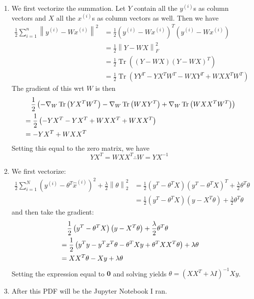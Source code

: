 \documentclass[12pt]{article}
\DeclareMathOperator{\Tr}{Tr}
\newcommand{\norm}[1]{\left\lVert#1\right\rVert}
\begin{document}
\begin{enumerate}
      \item We first vectorize the summation.
            Let $Y$ contain all the $y^{(i)}$s as column vectors
            and $X$ all the $x^{(i)}$s as column vectors as well.
            Then we have
            \begin{align*}
                  \frac{1}{2} \sum_{i=1}^{n} \norm{y^{(i)} - Wx^{(i)}}^2
                   & = \frac{1}{2} \left(y^{(i)} - Wx^{(i)}\right)^T\left(y^{(i)} - Wx^{(i)}\right) \\
                   & = \frac{1}{2} \norm{Y-WX}^2_F                                                  \\
                   & = \frac{1}{2} \Tr\left((Y-WX)(Y-WX)^T\right)                                   \\
                   & = \frac{1}{2} \Tr\left(YY^T-YX^TW^T-WXY^T+WXX^TW^T\right)
            \end{align*}
            The gradient of this wrt $W$ is then
            \begin{align*}
                   & \hphantom{={}} \frac{1}{2} \left(-\nabla_W \Tr\left(YX^TW^T\right)-\nabla_W \Tr\left(WXY^T\right)+\nabla_W \Tr\left(WXX^TW^T\right)\right) \\
                   & = \frac{1}{2} \left(-YX^T-YX^T+WXX^T+WXX^T\right)                                                                                          \\
                   & = -YX^T+WXX^T
            \end{align*}
            Setting this equal to the zero matrix, we have
            \[YX^T=WXX^T \therefore W=\boxed{YX^{-1}}\]

            \pagebreak

      \item We first vectorize:
            \begin{align*}
                  \frac{1}{2}\sum_{i=1}^{N} \left(y^{(i)}-\theta^T\hat{x}^{(i)}\right)^2+\frac{\lambda}{2}\norm{\theta}^2_2
                   & =\frac{1}{2}\left(y^T-\theta^TX\right)\left(y^T-\theta^TX\right)^T+\frac{\lambda}{2}\theta^T\theta \\
                   & =\frac{1}{2}\left(y^T-\theta^TX\right)\left(y-X^T\theta\right)+\frac{\lambda}{2}\theta^T\theta
            \end{align*}
            and then take the gradient:
            \begin{align*}
                   & \hphantom{={}}\frac{1}{2}\left(y^T-\theta^TX\right)\left(y-X^T\theta\right)+\frac{\lambda}{2}\theta^T\theta \\
                   & = \frac{1}{2}\left(y^Ty-y^Tx^T\theta-\theta^TXy+\theta^TXX^T\theta\right)+\lambda\theta                     \\
                   & = XX^T\theta-Xy+\lambda\theta
            \end{align*}
            Setting the expression equal to $\mathbf{0}$ and solving yields
            $\boxed{\theta=\left(XX^T+\lambda I\right)^{-1}Xy}$.

      \item After this PDF will be the Jupyter Notebook I ran.
\end{enumerate}
\end{document}
